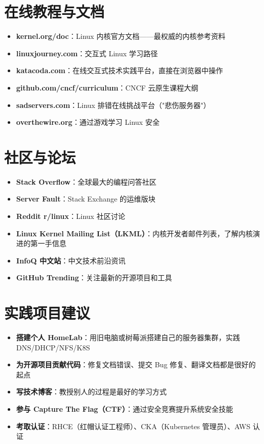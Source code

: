 \documentclass[12pt,UTF8]{ctexbook}
\begin{document}
\section{在线教程与文档}
\begin{itemize}
    \item \textbf{kernel.org/doc}：Linux 内核官方文档——最权威的内核参考资料
    \item \textbf{linuxjourney.com}：交互式 Linux 学习路径
    \item \textbf{katacoda.com}：在线交互式技术实践平台，直接在浏览器中操作
    \item \textbf{github.com/cncf/curriculum}：CNCF 云原生课程大纲
    \item \textbf{sadservers.com}：Linux 排错在线挑战平台（"悲伤服务器"）
    \item \textbf{overthewire.org}：通过游戏学习 Linux 安全
\end{itemize}

\section{社区与论坛}
\begin{itemize}
    \item \textbf{Stack Overflow}：全球最大的编程问答社区
    \item \textbf{Server Fault}：Stack Exchange 的运维版块
    \item \textbf{Reddit r/linux}：Linux 社区讨论
    \item \textbf{Linux Kernel Mailing List（LKML）}：内核开发者邮件列表，了解内核演进的第一手信息
    \item \textbf{InfoQ 中文站}：中文技术前沿资讯
    \item \textbf{GitHub Trending}：关注最新的开源项目和工具
\end{itemize}

\section{实践项目建议}
\begin{itemize}
    \item \textbf{搭建个人 HomeLab}：用旧电脑或树莓派搭建自己的服务器集群，实践 DNS/DHCP/NFS/K8S
    \item \textbf{为开源项目贡献代码}：修复文档错误、提交 Bug 修复、翻译文档都是很好的起点
    \item \textbf{写技术博客}：教授别人的过程是最好的学习方式
    \item \textbf{参与 Capture The Flag（CTF）}：通过安全竞赛提升系统安全技能
    \item \textbf{考取认证}：RHCE（红帽认证工程师）、CKA（Kubernetes 管理员）、AWS 认证
\end{itemize}
\end{document}
